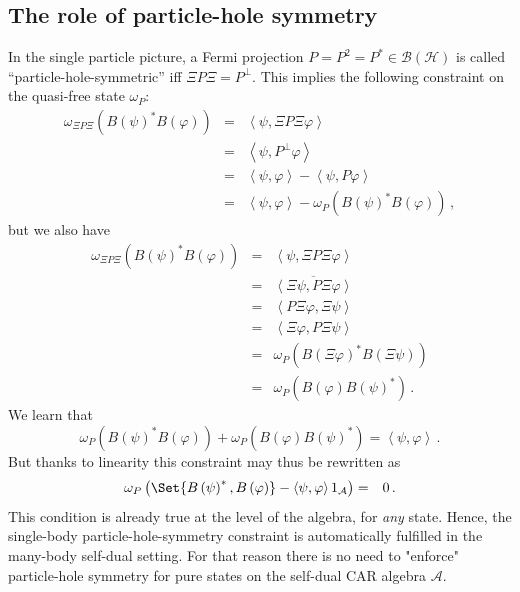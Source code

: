 \documentclass[a4paper,10pt]{article}
\numberwithin{equation}{section}
\theoremstyle{plain}
\theoremstyle{plain}
\theoremstyle{plain}
\theoremstyle{plain}
\theoremstyle{plain}
\theoremstyle{remark}
\theoremstyle{definition}
\newcommand{\calA}{\mathcal{A}}
\begin{document}
\subsection{The role of particle-hole symmetry}
\label{sec:role of particle-hole symmetry}
In the single particle picture, a Fermi projection $P=P^{2}=P^{\ast}\in\mathcal{B}\left(\mathcal{H}\right)$
is called ``particle-hole-symmetric'' iff $\Xi P\Xi=P^{\perp}$.
This implies the following constraint on the quasi-free state $\omega_{P}$:
\begin{eqnarray*}
\omega_{\Xi P\Xi}\left(B\left(\psi\right)^{\ast}B\left(\varphi\right)\right) & = & \left\langle \psi,\Xi P\Xi\varphi\right\rangle \\
 & = & \left\langle \psi,P^{\perp}\varphi\right\rangle \\
 & = & \left\langle \psi,\varphi\right\rangle -\left\langle \psi,P\varphi\right\rangle \\
 & = & \left\langle \psi,\varphi\right\rangle -\omega_{P}\left(B\left(\psi\right)^{\ast}B\left(\varphi\right)\right)\, ,
\end{eqnarray*}
but we also have
\begin{eqnarray*}
\omega_{\Xi P\Xi}\left(B\left(\psi\right)^{\ast}B\left(\varphi\right)\right) & = & \left\langle \psi,\Xi P\Xi\varphi\right\rangle \\
 & = & \overline{\left\langle \Xi\psi,P\Xi\varphi\right\rangle }\\
 & = & \left\langle P\Xi\varphi,\Xi\psi\right\rangle \\
 & = & \left\langle \Xi\varphi,P\Xi\psi\right\rangle \\
 & = & \omega_{P}\left(B\left(\Xi\varphi\right)^{\ast}B\left(\Xi\psi\right)\right)\\
 & = & \omega_{P}\left(B\left(\varphi\right)B\left(\psi\right)^{\ast}\right)\,.
\end{eqnarray*}
We learn that 
\[
\omega_{P}\left(B\left(\psi\right)^{\ast}B\left(\varphi\right)\right)+\omega_{P}\left(B\left(\varphi\right)B\left(\psi\right)^{\ast}\right)=\left\langle \psi,\varphi\right\rangle \,.
\]
But thanks to linearity this constraint may thus be rewritten as 
\begin{eqnarray*}
\omega_{P}\left(\Set{B\left(\psi\right)^{\ast},B\left(\varphi\right)}-\left\langle \psi,\varphi\right\rangle 1_\calA\right) & = & 0\,.
\end{eqnarray*}
This condition is already true at the level of the algebra, for \emph{any
}state. Hence, the single-body particle-hole-symmetry constraint
is automatically fulfilled in the many-body self-dual setting. For that reason there is no need to "enforce" particle-hole symmetry for pure states on the self-dual CAR algebra $\calA$.
\end{document}
